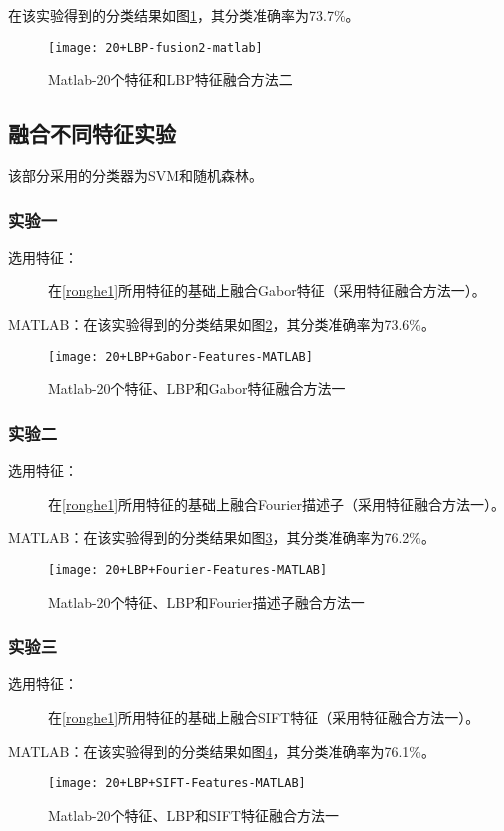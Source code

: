 在该实验得到的分类结果如图\ref{fig:20+LBP-fusion2-matlab}，其分类准确率为73.7\%。
\begin{figure}[!ht]
\centering
\texttt{[image: 20+LBP-fusion2-matlab]}
\caption{Matlab-20个特征和LBP特征融合方法二}
\label{fig:20+LBP-fusion2-matlab}
\end{figure}

\subsection{融合不同特征实验}
该部分采用的分类器为SVM和随机森林。
\subsubsection{实验一}
\begin{description}
\item[选用特征：] 在\ref{ronghe1}所用特征的基础上融合Gabor特征（采用特征融合方法一）。
\end{description}
MATLAB：在该实验得到的分类结果如图\ref{fig:20+LBP+Gabor-Features-MATLAB}，其分类准确率为73.6\%。
\begin{figure}[!ht]
\centering
\texttt{[image: 20+LBP+Gabor-Features-MATLAB]}
\caption{Matlab-20个特征、LBP和Gabor特征融合方法一}
\label{fig:20+LBP+Gabor-Features-MATLAB}
\end{figure}

\subsubsection{实验二}
\begin{description}
\item[选用特征：] 在\ref{ronghe1}所用特征的基础上融合Fourier描述子（采用特征融合方法一）。
\end{description}
MATLAB：在该实验得到的分类结果如图\ref{fig:20+LBP+Fourier-Features-MATLAB}，其分类准确率为76.2\%。
\begin{figure}[!ht]
\centering
\texttt{[image: 20+LBP+Fourier-Features-MATLAB]}
\caption{Matlab-20个特征、LBP和Fourier描述子融合方法一}
\label{fig:20+LBP+Fourier-Features-MATLAB}
\end{figure}

\subsubsection{实验三}
\begin{description}
\item[选用特征：] 在\ref{ronghe1}所用特征的基础上融合SIFT特征（采用特征融合方法一）。
\end{description}
MATLAB：在该实验得到的分类结果如图\ref{fig:20+LBP+SIFT-Features-MATLAB}，其分类准确率为76.1\%。
\begin{figure}[!ht]
\centering
\texttt{[image: 20+LBP+SIFT-Features-MATLAB]}
\caption{Matlab-20个特征、LBP和SIFT特征融合方法一}
\label{fig:20+LBP+SIFT-Features-MATLAB}
\end{figure}

